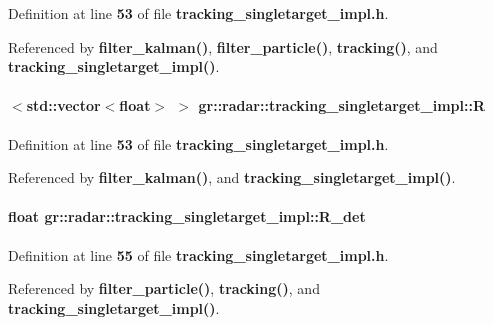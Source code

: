 Definition at line {\bf 53} of file {\bf tracking\+\_\+singletarget\+\_\+impl.\+h}.



Referenced by {\bf filter\+\_\+kalman()}, {\bf filter\+\_\+particle()}, {\bf tracking()}, and {\bf tracking\+\_\+singletarget\+\_\+impl()}.

\paragraph[{R}]{$<${\bf std\+::vector}$<$float$>$ $>$ gr\+::radar\+::tracking\+\_\+singletarget\+\_\+impl\+::R}\label{classgr_1_1radar_1_1tracking__singletarget__impl_a266590a06d345cde2c0a13f7a42e2ad3}


Definition at line {\bf 53} of file {\bf tracking\+\_\+singletarget\+\_\+impl.\+h}.



Referenced by {\bf filter\+\_\+kalman()}, and {\bf tracking\+\_\+singletarget\+\_\+impl()}.

\paragraph[{R\+\_\+det}]{\setlength{\rightskip}{0pt plus 5cm}float gr\+::radar\+::tracking\+\_\+singletarget\+\_\+impl\+::\+R\+\_\+det}\label{classgr_1_1radar_1_1tracking__singletarget__impl_a7c5b81dad5cf815b341ed98567d60792}


Definition at line {\bf 55} of file {\bf tracking\+\_\+singletarget\+\_\+impl.\+h}.



Referenced by {\bf filter\+\_\+particle()}, {\bf tracking()}, and {\bf tracking\+\_\+singletarget\+\_\+impl()}.

